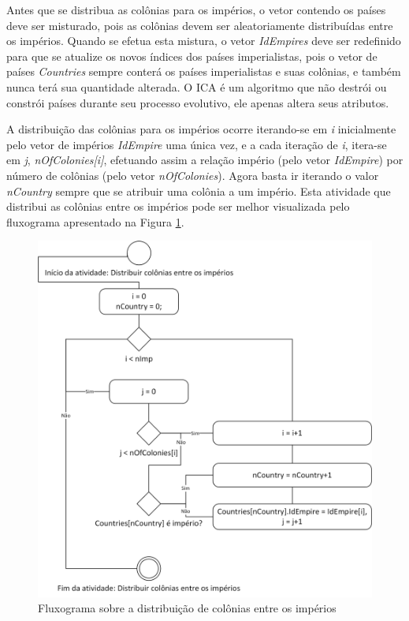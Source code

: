 Antes que se distribua as colônias para os impérios, o vetor contendo os países deve ser misturado, pois as colônias devem ser aleatoriamente distribuídas entre os impérios. Quando se efetua esta mistura, o vetor \emph{IdEmpires} deve ser redefinido para que se atualize os novos índices dos países imperialistas, pois o vetor de países \emph{Countries} sempre conterá os países imperialistas e suas colônias, e também nunca terá sua quantidade alterada. O ICA é um algoritmo que não destrói ou constrói países durante seu processo evolutivo, ele apenas altera seus atributos. 

A distribuição das colônias para os impérios ocorre iterando-se em \emph{i} inicialmente pelo vetor de impérios \emph{IdEmpire} uma única vez, e a cada iteração de \emph{i}, itera-se em \emph{j}, \emph{nOfColonies[i]}, efetuando assim a relação império (pelo vetor \emph{IdEmpire}) por número de colônias (pelo vetor \emph{nOfColonies}). Agora basta ir iterando o valor \emph{nCountry} sempre que se atribuir uma colônia a um império. Esta atividade que distribui as colônias entre os impérios pode ser melhor visualizada pelo fluxograma apresentado na Figura \ref{fig:Fluxograms-RunMethodEmpireDistribution}.

 \begin{figure}[h]
	\centering	
	\includegraphics[scale=0.7]{Figuras/Fluxograms-RunMethodEmpireDistribution.png}
	\caption{Fluxograma sobre a distribuição de colônias entre os impérios}
	\label{fig:Fluxograms-RunMethodEmpireDistribution}
	\end{figure}

